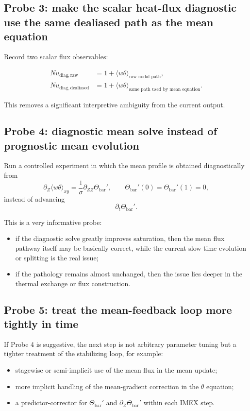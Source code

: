 \documentclass[11pt]{article}
\begin{document}
\subsection{Probe 3: make the scalar heat-flux diagnostic use the same dealiased path as the mean equation}

Record two scalar flux observables:

\begin{align*}
Nu_{\mathrm{diag,raw}} &= 1 + \langle w\theta\rangle_{\text{raw nodal path}}, \\
Nu_{\mathrm{diag,dealiased}} &= 1 + \langle w\theta\rangle_{\text{same path used by mean equation}}.
\end{align*}

This removes a significant interpretive ambiguity from the current output.

\subsection{Probe 4: diagnostic mean solve instead of prognostic mean evolution}

Run a controlled experiment in which the mean profile is obtained diagnostically from
\[
\partial_Z\langle w\theta\rangle_{xy}
=
\frac{1}{\sigma}\partial_{ZZ}\Theta_{\mathrm{bar}}',
\qquad
\Theta_{\mathrm{bar}}'(0)=\Theta_{\mathrm{bar}}'(1)=0,
\]
instead of advancing
\[
\partial_t\Theta_{\mathrm{bar}}'.
\]

This is a very informative probe:

\begin{itemize}
\item if the diagnostic solve greatly improves saturation, then the mean flux pathway itself may be basically correct, while the current slow-time evolution or splitting is the real issue;
\item if the pathology remains almost unchanged, then the issue lies deeper in the thermal exchange or flux construction.
\end{itemize}

\subsection{Probe 5: treat the mean-feedback loop more tightly in time}

If Probe 4 is suggestive, the next step is not arbitrary parameter tuning but a tighter treatment of the stabilizing loop, for example:

\begin{itemize}
\item stagewise or semi-implicit use of the mean flux in the mean update;
\item more implicit handling of the mean-gradient correction in the $\theta$ equation;
\item a predictor-corrector for $\Theta_{\mathrm{bar}}'$ and $\partial_Z\Theta_{\mathrm{bar}}'$ within each IMEX step.
\end{itemize}
\end{document}
